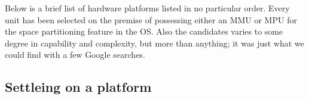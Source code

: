 Below is a brief list of hardware platforms listed in no particular order.
Every unit has been selected on the premise of possessing either an MMU or MPU for the space partitioning feature in the OS.
Also the candidates varies to some degree in capability and complexity,
but more than anything; it was just what we could find with a few Google searches.

\subsection{Settleing on a platform}


\section{}
